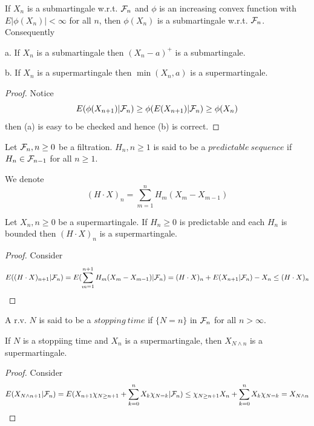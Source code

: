 \begin{theorem}
    If $X_n$ is a submartingale w.r.t. $\mathcal{F}_n$ and $\phi$ is an increasing convex function with $E|\phi(X_n)| < \infty$ for all $n$, then $\phi(X_n)$ is a submartingale w.r.t. $\mathcal{F}_n$. Consequently\par
    a. If $X_n$ is a submartingale then $(X_n-a)^+$ is a submartingale.\par
    b. If $X_n$ is a supermartingale then $\min(X_n,a)$ is a supermartingale.
\end{theorem}
\begin{proof}
    Notice
    \[E(\phi(X_{n+1})|\mathcal{F}_n) \geq \phi(E(X_{n+1})|\mathcal{F}_n) \geq \phi(X_n)\]
    then (a) is easy to be checked and hence (b) is correct.
\end{proof}

\begin{definition}
    Let $\mathcal{F}_n, n\geq 0$ be a filtration. $H_n, n\geq 1$ is said to be a $predictable\ sequence$ if $H_n\in\mathcal{F}_{n-1}$ for all $n\geq 1$.
\end{definition}

\begin{definition}
    We denote
    \[(H\cdot X)_n = \sum\limits_{m=1}^n H_m(X_m-X_{m-1})\]
\end{definition}

\begin{theorem}
    Let $X_n, n\geq 0$ be a supermartingale. If $H_n\geq 0$ is predictable and each $H_n$ is bounded then $(H\cdot X)_n$ is a supermartingale.
\end{theorem}
\begin{proof}
    Consider
    \[E((H\cdot X)_{n+1}|\mathcal{F}_n) = E(\sum\limits_{m=1}^{n+1} H_m(X_m-X_{m-1})|\mathcal{F}_n) = (H\cdot X)_n + E(X_{n+1}|\mathcal{F}_n) - X_n \leq (H\cdot X)_n\]
\end{proof}

\begin{definition}
    A r.v. $N$ is said to be a $stopping\ time$ if $\{N=n\}$ in $\mathcal{F}_n$ for all $n>\infty$.
\end{definition}
\begin{theorem}
    If $N$ is a stoppiing time and $X_n$ is a supermartingale, then $X_{N\wedge n}$ is a supermartingale.
\end{theorem}
\begin{proof}
    Consider
    \[E(X_{N\wedge n+1}|\mathcal{F}_n) = E(X_{n+1}\chi_{N\geq n+1}+\sum\limits_{k=0}^nX_{k}\chi_{N = k}|\mathcal{F}_n) \leq \chi_{N\geq n+1} X_n + \sum\limits_{k=0}^nX_{k}\chi_{N = k} = X_{N\wedge n}\]
\end{proof}


